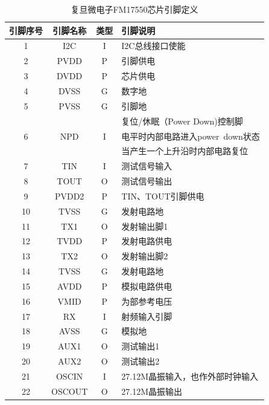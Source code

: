 \documentclass[a4paper]{ctexart}
\begin{document}
\begin{spacing}{1.5}
\begin{appendices}
\begin{table}[htbp]
	\centering
	\caption{复旦微电子FM17550芯片引脚定义}
	\label{tab:引脚定义}
	\begin{tabular}{|c|c|c|l|}
		\hline
		引脚序号  & 引脚名称  & 类型    & 引脚说明 \\
		\hline
		1     & I2C   & I     & I2C总线接口使能 \\
		\hline
		2     & PVDD  & P     & 引脚供电 \\
		\hline
		3     & DVDD  & P     & 芯片供电 \\
		\hline
		4     & DVSS  & G     & 数字地 \\
		\hline
		5     & PVSS  & G     & 引脚地 \\
		\hline
		      &       &       & \multicolumn{1}{p{23.585em}|}{复位/休眠（Power Down)控制脚} \\
		6     &NPD    & I     & \multicolumn{1}{p{23.585em}|}{电平时内部电路进入power down状态} \\
		      &       &       & \multicolumn{1}{p{23.585em}|}{当产生一个上升沿时内部电路复位} \\
		\hline
		7     & TIN   & I     & 测试信号输入 \\
		\hline
		8     & TOUT  & O     & 测试信号输出 \\
		\hline
		9     & PVDD2 & P     & TIN、TOUT引脚供电 \\
		\hline
		10    & TVSS  & G     & 发射电路地 \\
		\hline
		11    & TX1   & O     & 发射输出脚1 \\
		\hline
		12    & TVDD  & P     & 发射电路供电 \\
		\hline
		13    & TX2   & O     & 发射输出脚2 \\
		\hline
		14    & TVSS  & G     & 发射电路地 \\
		\hline
		15    & AVDD  & P     & 模拟电路供电 \\
		\hline
		16    & VMID  & P     & 为部参考电压 \\
		\hline
		17    & RX    & I     & 射频输入引脚 \\
		\hline
		18    & AVSS  & G     & 模拟地 \\
		\hline
		19    & AUX1  & O     & 测试输出1 \\
		\hline
		20    & AUX2  & O     & 测试输出2 \\
		\hline
		21    & OSCIN & I     & 27.12M晶振输入，也作外部时钟输入 \\
		\hline
		22    & OSCOUT & O     & 27.12M晶振输出 \\

\end{tabular}
\end{table}
\end{appendices}
\end{spacing}
\end{document}
